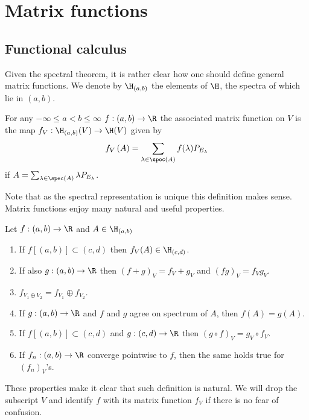 \section{Matrix functions}

\subsection{Functional calculus}

Given the spectral theorem, it is rather clear how one should define general matrix functions. We denote by $\H_{(a, b)}$ the elements of $\H$, the spectra of which lie in $(a, b)$.

\begin{maar}
	For any $-\infty \leq a < b \leq \infty$ $f : (a, b) \to \R$ the associated matrix function on $V$ is the map $f_{V} : \H_{(a, b)}(V) \to \H(V)$ given by
	\begin{align*}
		f_{V}\left(A\right) = \sum_{\lambda \in \spec(A)} f(\lambda) P_{E_{\lambda}}
	\end{align*}
	if $A = \sum_{\lambda \in \spec(A)} \lambda P_{E_{\lambda}}$.
\end{maar}
Note that as the spectral representation is unique this definition makes sense. Matrix functions enjoy many natural and useful properties.

\begin{prop}\label{basic_matrix}
	Let $f : (a,b) \to \R$ and $A \in \H_{(a, b)}$
	\begin{enumerate}
		\item If $f[(a, b)] \subset (c, d)$ then $f_{V}(A) \in \H_{(c, d)}$.
		\item If also $g : (a, b) \to \R$ then $(f + g)_{V} = f_{V} + g_{V}$ and $(fg)_{V} = f_{V}g_{V}$.
		\item $f_{V_{1} \oplus V_{2}} = f_{V_{1}} \oplus f_{V_{2}}$.
		\item If $g : (a, b) \to \R$ and $f$ and $g$ agree on spectrum of $A$, then $f(A) = g(A)$.
		\item If $f[(a, b)] \subset (c, d)$ and $g : (c, d) \to \R$ then $(g \circ f)_{V} = g_{V} \circ f_{V}$.
		\item If $f_{n} : (a, b) \to \R$ converge pointwise to $f$, then the same holds true for $(f_{n})_{V}$'s.
	\end{enumerate}
\end{prop}

These properties make it clear that such definition is natural. We will drop the subscript $V$ and identify $f$ with its matrix function $f_{V}$ if there is no fear of confusion.

